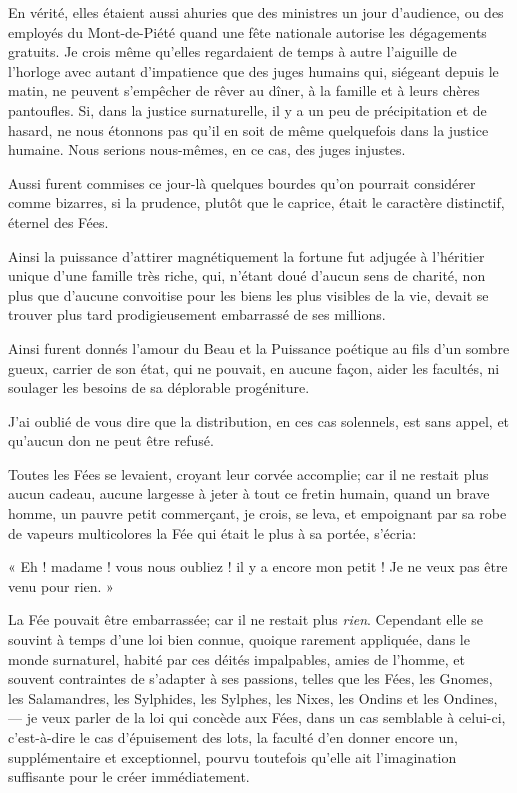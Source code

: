 En vérité, elles étaient aussi ahuries que des ministres un jour
d’audience, ou des employés du Mont{}-de{}-Piété quand
une fête nationale autorise les dégagements gratuits. Je crois même
qu’elles regardaient de temps à autre
l’aiguille de l’horloge avec autant
d’impatience que des juges humains qui, siégeant
depuis le matin, ne peuvent s’empêcher de rêver au
dîner, à la famille et à leurs chères pantoufles. Si, dans la justice
surnaturelle, il y a un peu de précipitation et de hasard, ne nous
étonnons pas qu’il en soit de même quelquefois dans la
justice humaine. Nous serions nous{}-mêmes, en ce cas, des juges
injustes.

Aussi furent commises ce jour{}-là quelques bourdes
qu’on pourrait considérer comme bizarres, si la
prudence, plutôt que le caprice, était le caractère distinctif, éternel
des Fées.

Ainsi la puissance d’attirer magnétiquement la fortune
fut adjugée à l’héritier unique d’une
famille très riche, qui, n’étant doué
d’aucun sens de charité, non plus que
d’aucune convoitise pour les biens les plus visibles
de la vie, devait se trouver plus tard prodigieusement embarrassé de
ses millions.

Ainsi furent donnés l’amour du Beau et la Puissance
poétique au fils d’un sombre gueux, carrier de son
état, qui ne pouvait, en aucune façon, aider les facultés, ni soulager
les besoins de sa déplorable progéniture.

J’ai oublié de vous dire que la distribution, en ces
cas solennels, est sans appel, et qu’aucun don ne peut
être refusé.

Toutes les Fées se levaient, croyant leur corvée accomplie; car il ne
restait plus aucun cadeau, aucune largesse à jeter à tout ce fretin
humain, quand un brave homme, un pauvre petit commerçant, je crois, se
leva, et empoignant par sa robe de vapeurs multicolores la Fée qui
était le plus à sa portée, s’écria:

« Eh ! madame ! vous nous oubliez ! il y a encore mon petit ! Je ne veux
pas être venu pour rien. »

La Fée pouvait être embarrassée; car il ne restait plus \textit{rien}. Cependant
elle se souvint à temps d’une loi bien connue, quoique
rarement appliquée, dans le monde surnaturel, habité par ces déités
impalpables, amies de l’homme, et souvent contraintes
de s’adapter à ses passions, telles que les Fées, les
Gnomes, les Salamandres, les Sylphides, les Sylphes, les Nixes, les
Ondins et les Ondines, --- je veux parler de la loi qui concède aux Fées,
dans un cas semblable à celui{}-ci, c’est{}-à{}-dire
le cas d’épuisement des lots, la faculté
d’en donner encore un, supplémentaire et exceptionnel,
pourvu toutefois qu’elle ait
l’imagination suffisante pour le créer immédiatement.

